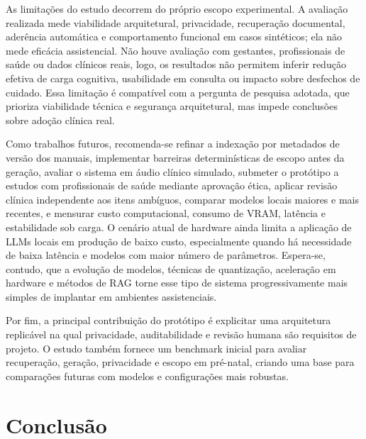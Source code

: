 \documentclass[12pt]{article}
\begin{document}
As limitações do estudo decorrem do próprio escopo experimental. A avaliação realizada mede viabilidade arquitetural, privacidade, recuperação documental, aderência automática e comportamento funcional em casos sintéticos; ela não mede eficácia assistencial. Não houve avaliação com gestantes, profissionais de saúde ou dados clínicos reais, logo, os resultados não permitem inferir redução efetiva de carga cognitiva, usabilidade em consulta ou impacto sobre desfechos de cuidado. Essa limitação é compatível com a pergunta de pesquisa adotada, que prioriza viabilidade técnica e segurança arquitetural, mas impede conclusões sobre adoção clínica real.

Como trabalhos futuros, recomenda-se refinar a indexação por metadados de versão dos manuais, implementar barreiras determinísticas de escopo antes da geração, avaliar o sistema em áudio clínico simulado, submeter o protótipo a estudos com profissionais de saúde mediante aprovação ética, aplicar revisão clínica independente aos itens ambíguos, comparar modelos locais maiores e mais recentes, e mensurar custo computacional, consumo de VRAM, latência e estabilidade sob carga. O cenário atual de hardware ainda limita a aplicação de LLMs locais em produção de baixo custo, especialmente quando há necessidade de baixa latência e modelos com maior número de parâmetros. Espera-se, contudo, que a evolução de modelos, técnicas de quantização, aceleração em hardware e métodos de RAG torne esse tipo de sistema progressivamente mais simples de implantar em ambientes assistenciais.

Por fim, a principal contribuição do protótipo é explicitar uma arquitetura replicável na qual privacidade, auditabilidade e revisão humana são requisitos de projeto. O estudo também fornece um benchmark inicial para avaliar recuperação, geração, privacidade e escopo em pré-natal, criando uma base para comparações futuras com modelos e configurações mais robustas.



\section{Conclusão}
\end{document}
